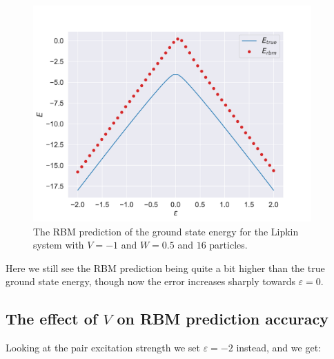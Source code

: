\begin{figure}[H]
  \begin{center}
    \includegraphics[width=0.95\textwidth]{Figures/Plots/Lipkin/val-true[eps][-2.0-2.0][e=850][n=16][V=-0.5][W=0.5].pdf}
  \end{center}
  \caption{The RBM prediction of the ground state energy for the Lipkin system with $V=-1$ and $W=0.5$ and $16$ particles.}
\end{figure}

Here we still see the RBM prediction being quite a bit higher than the true ground state energy, though now the error increases sharply towards $\varepsilon = 0$.

\subsection{The effect of \texorpdfstring{$V$}{V} on RBM prediction accuracy}

Looking at the pair excitation strength we set $\varepsilon = -2$ instead, and we get:

